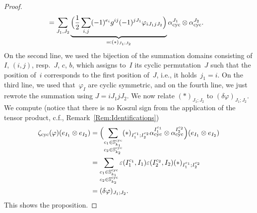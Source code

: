 \documentclass[\MainFolder/Text.tex]{subfiles}
\begin{document}
\begin{proof}
\begin{align*}
 & = \sum_{J_1, J_2}\underbrace{\Bigl(\frac{1}{2}\sum_{i,j} (-1)^{e_i} g^{ij}(-1)^{j J_1} \varphi_{i J_1 j J_2} \Bigr)}_{\eqqcolon(*)_{J_1;J_2}}\alpha^{J_1}_{\mathrm{cyc}}\otimes\alpha^{J_2}_{\mathrm{cyc}}.
\end{align*}
On the second line, we used the bijection of the summation domains consisting of $I$, $(i,j)$, resp.~$J$, $c$, $b$, which assigns to~$I$ its cyclic permutation~$J$ such that the position of~$i$ corresponds to the first position of~$J$, i.e., it holds~$j_1 = i$. On the third line, we used that~$\varphi_I$ are cyclic symmetric, and on the fourth line, we just rewrote the summation using $J = i J_1 j J_2$. We now relate $(*)_{J_1;J_2}$ to $(\delta\varphi)_{J_1;J_2}$. We compute (notice that there is no Koszul sign from the application of the tensor product, c.f., Remark~\ref{Rem:Identifications})
\begin{align*}
\zeta_{\text{cyc}}(\varphi)(e_{I_1}\otimes e_{I_2}) & = \Bigl(\sum_{\substack{c_1\in\mathbb{S}^{\mathrm{cyc}}_{k_1}\\c_2\in\mathbb{S}^{\mathrm{cyc}}_{k_2}}}(*)_{I_1^{c_1};I_2^{c_2}}\alpha_{\mathrm{cyc}}^{I_1^{c_1}}\otimes\alpha_{\mathrm{cyc}}^{I_2^{c_2}}\Bigr)(e_{I_1}\otimes e_{I_2}) \\
& = \sum_{\substack{c_1\in\mathbb{S}^{\mathrm{cyc}}_{k_1}\\c_2\in\mathbb{S}^{\mathrm{cyc}}_{k_2}}}\varepsilon(I_1^{c_1},I_1)\varepsilon(I_2^{c_2},I_2)(*)_{I_1^{c_1};I_2^{c_2}} \\
& = (\delta\varphi)_{J_1;J_2}.
\end{align*}
This shows the proposition.
\end{proof}
\end{document}

